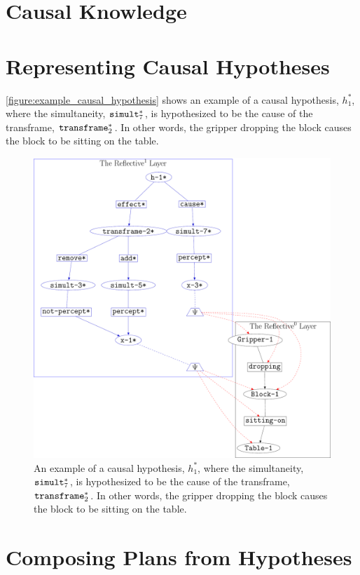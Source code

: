 \section{Causal Knowledge}

\section{Representing Causal Hypotheses}

{\mbox{\autoref{figure:example_causal_hypothesis}}} shows an example
of a causal hypothesis, $h_1^*$, where the simultaneity,
$\text{\tt{simult}}_7^*$, is hypothesized to be the cause of the
transframe, $\text{\tt{transframe}}_2^*$.  In other words, the gripper
dropping the block causes the block to be sitting on the table.
\begin{figure}
\center
\includegraphics[width=12cm]{gfx/example_causal_hypothesis}
\caption[An example of a causal hypothesis.]{An example of a causal
  hypothesis, $h_1^*$, where the simultaneity,
  $\text{\tt{simult}}_7^*$, is hypothesized to be the cause of the
  transframe, $\text{\tt{transframe}}_2^*$.  In other words, the
  gripper dropping the block causes the block to be sitting on the
  table.}
\label{figure:example_causal_hypothesis}
\end{figure}

\section{Composing Plans from Hypotheses}

